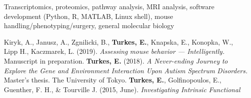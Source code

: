%
%
%

\vspace*{-0.2cm}

\begin{cvskills}

    {Transcriptomics, proteomics, pathway analysis, MRI analysis, software development
        (Python, R, \newline MATLAB, Linux shell), mouse handling/phenotyping/surgery,
        general molecular biology}

    \vspace*{-0.1cm}
    {\small{Kiryk, A., Janusz, A., Zgnilicki, B., \textbf{Turkes, E.}, Knapska, E.,
        Konopka, W., Lipp H., Kaczmarek, L. (2019). \textit{Assessing}}
        \vspace*{-0.001cm}}
    \cvskill{}
    {\small{\hspace*{20pt}\textit{mouse behavior — Intelligently.} Manuscript in
        preparation.}}
    \vspace*{-0.1cm}
    \cvskill{}
    {\small{\textbf{Turkes, E.} (2018). \textit{A Never-ending Journey to Explore the
        Gene and Environment Interaction Upon Autism Spectrum}}\vspace*{-0.001cm}}
    \cvskill{}
    {\small{\hspace*{20pt}\textit{Disorders.} Master's thesis. The
        University of Tokyo.}}
    \vspace*{-0.1cm}
    \cvskill{}
    {\small{\textbf{Turkes, E.}, Golfinopoulos, E., Guenther, F. H., \& Tourville J.
        (2015, June). \textit{Investigating Intrinsic Functional}}}
    \cvskill{}
    {\small{}}

\vspace*{-1cm}
\end{cvskills}
